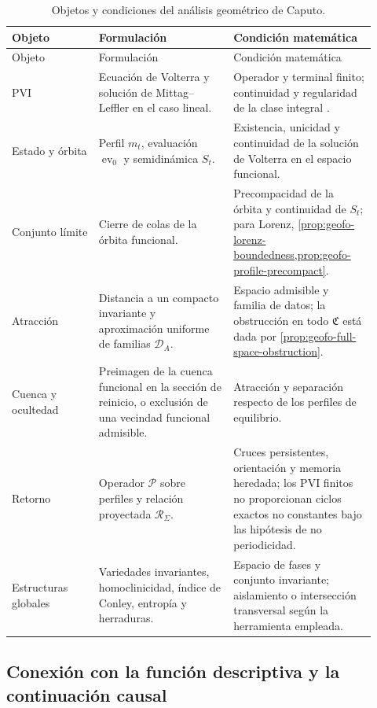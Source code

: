 \begin{longtable}{@{}L{0.22\linewidth}L{0.34\linewidth}L{0.36\linewidth}@{}}
\caption{Objetos y condiciones del análisis geométrico de Caputo.}
\label{tab:geofo-theory-boundary}\\
\toprule
Objeto & Formulación & Condición matemática \\
\midrule
\endfirsthead
\toprule
Objeto & Formulación & Condición matemática \\
\midrule
\endhead
PVI & Ecuación de Volterra y solución de Mittag--Leffler en el caso lineal. &
Operador y terminal finito; continuidad y regularidad de la clase integral
\cite{Matignon1996,CongTuan2017Nonlocal,DoanKloeden2021Semidynamical,
TavazoeiHaeri2009,KaslikSivasundaram2012}.\\
Estado y órbita & Perfil \(m_t\), evaluación \(\operatorname{ev}_0\)
y semidinámica \(S_t\). & Existencia, unicidad y continuidad de la solución
de Volterra en el espacio funcional.\\
Conjunto límite & Cierre de colas de la órbita funcional. & Precompacidad de
la órbita y continuidad de \(S_t\); para Lorenz,
\cref{prop:geofo-lorenz-boundedness,prop:geofo-profile-precompact}.\\
Atracción & Distancia a un compacto invariante y aproximación uniforme de
familias \(\mathcal D_A\). & Espacio admisible y familia de datos;
la obstrucción en todo \(\mathfrak C\) está dada por
\cref{prop:geofo-full-space-obstruction}.\\
Cuenca y ocultedad & Preimagen de la cuenca funcional en la sección de
reinicio, o exclusión de una vecindad funcional admisible. & Atracción y
separación respecto de los perfiles de equilibrio.\\
Retorno & Operador \(\mathcal P\) sobre perfiles y relación proyectada
\(\mathcal R_\Sigma\). & Cruces persistentes, orientación y memoria
heredada; los PVI finitos no proporcionan ciclos exactos no constantes bajo
las hipótesis de no periodicidad.\\
Estructuras globales & Variedades invariantes, homoclinicidad, índice de
Conley, entropía y herraduras. & Espacio de fases y conjunto invariante;
aislamiento o intersección transversal según la herramienta empleada.\\
\bottomrule
\end{longtable}

\subsection{Conexión con la función descriptiva y la continuación causal}

